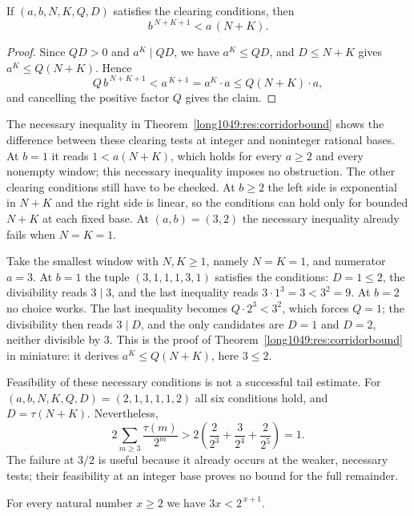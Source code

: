 \begin{theorem}\label{long1049:res:corridorbound}
If $(a,b,N,K,Q,D)$ satisfies the clearing conditions, then
\[
 b^{\,N+K+1}<a\,(N+K).
\]
\end{theorem}

\begin{proof}
Since $QD>0$ and $a^{K}\mid QD$, we have
$a^{K}\le QD$, and $D\le N+K$ gives
$a^{K}\le Q(N+K)$.  Hence
\[
 Q\,b^{\,N+K+1}<a^{\,K+1}=a^{K}\cdot a\le Q(N+K)\cdot a,
\]
and cancelling the positive factor $Q$ gives the claim.
\end{proof}

The necessary inequality in Theorem~\ref{long1049:res:corridorbound}
shows the difference between these clearing tests at integer and
noninteger rational bases.  At $b=1$ it reads $1<a(N+K)$, which holds for every
$a\ge2$ and every nonempty window; this necessary inequality imposes no
obstruction.  The other clearing conditions still have to be checked.
At $b\ge2$ the left side is exponential in $N+K$ and the right side is linear,
so the conditions can hold only for bounded $N+K$ at each fixed base.  At $(a,b)=(3,2)$ the
necessary inequality already fails when $N=K=1$.

\begin{example}\label{long1049:ex:corridor}
Take the smallest window with $N,K\ge1$, namely $N=K=1$, and numerator $a=3$.  At $b=1$ the tuple
$(3,1,1,1,3,1)$ satisfies the conditions: $D=1\le2$, the divisibility reads $3\mid3$, and
the last inequality reads $3\cdot1^{3}=3<3^{2}=9$. At $b=2$ no choice works.
The last inequality becomes $Q\cdot2^{3}<3^{2}$, which forces $Q=1$; the divisibility
then reads $3\mid D$, and the only candidates are $D=1$ and $D=2$, neither
divisible by $3$.  This is the proof of
Theorem~\ref{long1049:res:corridorbound} in miniature: it derives $a^{K}\le Q(N+K)$,
here $3\le2$.
\end{example}

Feasibility of these necessary conditions is not a successful tail
estimate. For $(a,b,N,K,Q,D)=(2,1,1,1,1,2)$ all six conditions hold,
and $D=\tau(N+K)$. Nevertheless,
\[
 2\sum_{m\ge3}\frac{\tau(m)}{2^m}
 >2\left(\frac2{2^3}+\frac3{2^4}+\frac2{2^5}\right)=1.
\]
The failure at $3/2$ is useful because it already occurs at the weaker,
necessary tests; their feasibility at an integer base proves no bound
for the full remainder.

\begin{proposition}\label{long1049:res:exp}
For every natural number $x\ge2$ we have $3x<2^{\,x+1}$.
\end{proposition}

